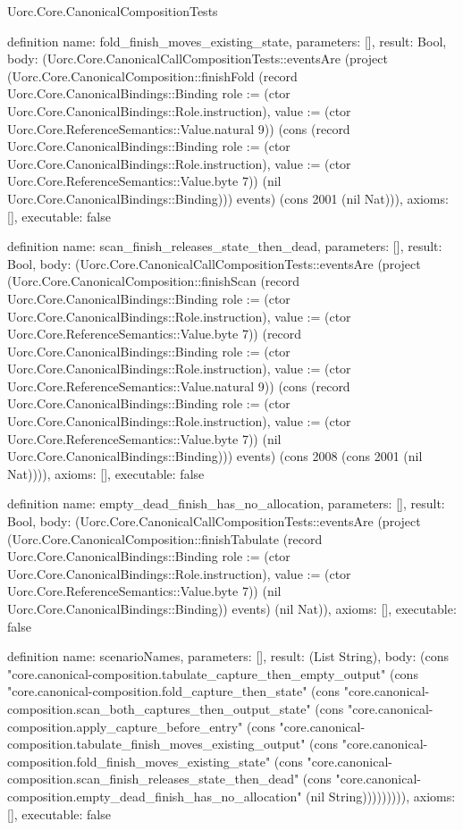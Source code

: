 \begin{lexlean}{Uorc.Core.CanonicalCompositionTests}
\begin{semanticmodule}
definition{
  name: fold_finish_moves_existing_state,
  parameters: [],
  result: Bool,
  body: (Uorc.Core.CanonicalCallCompositionTests::eventsAre (project (Uorc.Core.CanonicalComposition::finishFold (record Uorc.Core.CanonicalBindings::Binding {role := (ctor Uorc.Core.CanonicalBindings::Role.instruction), value := (ctor Uorc.Core.ReferenceSemantics::Value.natural 9)}) (cons (record Uorc.Core.CanonicalBindings::Binding {role := (ctor Uorc.Core.CanonicalBindings::Role.instruction), value := (ctor Uorc.Core.ReferenceSemantics::Value.byte 7)}) (nil Uorc.Core.CanonicalBindings::Binding))) events) (cons 2001 (nil Nat))),
  axioms: [],
  executable: false
}

definition{
  name: scan_finish_releases_state_then_dead,
  parameters: [],
  result: Bool,
  body: (Uorc.Core.CanonicalCallCompositionTests::eventsAre (project (Uorc.Core.CanonicalComposition::finishScan (record Uorc.Core.CanonicalBindings::Binding {role := (ctor Uorc.Core.CanonicalBindings::Role.instruction), value := (ctor Uorc.Core.ReferenceSemantics::Value.byte 7)}) (record Uorc.Core.CanonicalBindings::Binding {role := (ctor Uorc.Core.CanonicalBindings::Role.instruction), value := (ctor Uorc.Core.ReferenceSemantics::Value.natural 9)}) (cons (record Uorc.Core.CanonicalBindings::Binding {role := (ctor Uorc.Core.CanonicalBindings::Role.instruction), value := (ctor Uorc.Core.ReferenceSemantics::Value.byte 7)}) (nil Uorc.Core.CanonicalBindings::Binding))) events) (cons 2008 (cons 2001 (nil Nat)))),
  axioms: [],
  executable: false
}

definition{
  name: empty_dead_finish_has_no_allocation,
  parameters: [],
  result: Bool,
  body: (Uorc.Core.CanonicalCallCompositionTests::eventsAre (project (Uorc.Core.CanonicalComposition::finishTabulate (record Uorc.Core.CanonicalBindings::Binding {role := (ctor Uorc.Core.CanonicalBindings::Role.instruction), value := (ctor Uorc.Core.ReferenceSemantics::Value.byte 7)}) (nil Uorc.Core.CanonicalBindings::Binding)) events) (nil Nat)),
  axioms: [],
  executable: false
}

definition{
  name: scenarioNames,
  parameters: [],
  result: (List String),
  body: (cons "core.canonical-composition.tabulate_capture_then_empty_output" (cons "core.canonical-composition.fold_capture_then_state" (cons "core.canonical-composition.scan_both_captures_then_output_state" (cons "core.canonical-composition.apply_capture_before_entry" (cons "core.canonical-composition.tabulate_finish_moves_existing_output" (cons "core.canonical-composition.fold_finish_moves_existing_state" (cons "core.canonical-composition.scan_finish_releases_state_then_dead" (cons "core.canonical-composition.empty_dead_finish_has_no_allocation" (nil String))))))))),
  axioms: [],
  executable: false
}


\end{semanticmodule}
\end{lexlean}
